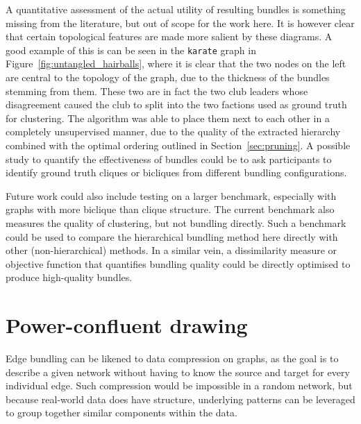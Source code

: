 A quantitative assessment of the actual utility of resulting bundles is something missing from the literature, but out of scope for the work here.
It is however clear that certain topological features are made more salient by these diagrams. A good example of this is can be seen in the \texttt{karate} graph in Figure~\ref{fig:untangled_hairballs}, where it is clear that the two nodes on the left are central to the topology of the graph, due to the thickness of the bundles stemming from them. These two are in fact the two club leaders whose disagreement caused the club to split into the two factions used as ground truth for clustering. The algorithm was able to place them next to each other in a completely unsupervised manner, due to the quality of the extracted hierarchy combined with the optimal ordering \citep{Bar-Joseph2001} outlined in Section~\ref{sec:pruning}.
A possible study to quantify the effectiveness of bundles could be to ask participants to identify ground truth cliques or bicliques from different bundling configurations.

Future work could also include testing on a larger benchmark, especially with graphs with more biclique than clique structure.
The current benchmark also measures the quality of clustering, but not bundling directly. Such a benchmark could be used to compare the hierarchical bundling method here directly with other (non-hierarchical) methods.
In a similar vein, a dissimilarity measure or objective function that quantifies bundling quality could be directly optimised to produce high-quality bundles.



\chapter{Power-confluent drawing}
\label{chap:power}
Edge bundling can be likened to data compression on graphs, as the goal is to describe a given network without having to know the source and target for every individual edge.
Such compression would be impossible in a random network, but because real-world data does have structure, underlying patterns can be leveraged to group together similar components within the data.

